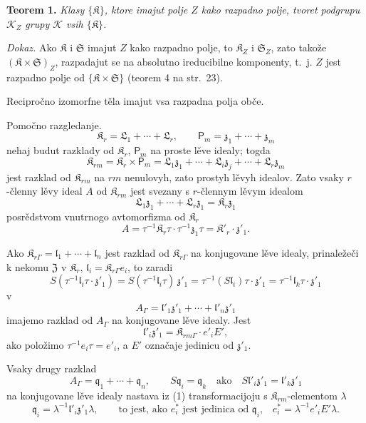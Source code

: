 \documentclass[11pt]{article}
\begin{document}
\textbf{Teorem 1.} \emph{Klasy \(\{\mathfrak K\}\), ktore imajut polje \(Z\) kako razpadno polje, tvoret podgrupu \(\mathscr K_Z\) grupy \(\mathscr K\) vsih \(\{\mathfrak K\}\).}

\emph{Dokaz.} Ako \(\mathfrak K\) i \(\mathfrak S\) imajut \(Z\) kako razpadno polje, to \(\mathfrak K_Z\) i \(\mathfrak S_Z\), zato takože \((\mathfrak K\times\mathfrak S)_Z\), razpadajut se na absolutno ireducibilne komponenty, t.~j. \(Z\) jest razpadno polje od \(\{\mathfrak K\times\mathfrak S\}\) (teorem 4 na str.~23).

Recipročno izomorfne těla imajut vsa razpadna polja obče.

Pomočno razgledanje.
\[
\mathfrak K_r=\mathfrak L_1+\cdots+\mathfrak L_r,\qquad
\mathsf P_m=\mathfrak z_1+\cdots+\mathfrak z_m
\]
nehaj budut razklady od \(\mathfrak K_r\), \(\mathsf P_m\) na proste lěve idealy; togda
\[
\mathfrak K_{rm}=\mathfrak K_r\times\mathsf P_m
=\mathfrak L_1\mathfrak z_1+\cdots+\mathfrak L_i\mathfrak z_j+\cdots+\mathfrak L_r\mathfrak z_m
\]
jest razklad od \(\mathfrak K_{rm}\) na \(rm\) nenulovyh, zato prostyh lěvyh idealov. Zato vsaky \(r\)-členny lěvy ideal \(A\) od \(\mathfrak K_{rm}\) jest svezany s \(r\)-člennym lěvym idealom
\[
\mathfrak L_1\mathfrak z_1+\cdots+\mathfrak L_r\mathfrak z_1=\mathfrak K_r\mathfrak z_1
\]
posrědstvom vnutrnogo avtomorfizma od \(\mathfrak K_r\)
\[
A=\tau^{-1}\mathfrak K_r\tau\cdot\tau^{-1}\mathfrak z_1\tau
=\mathfrak K'_r\cdot\mathfrak z'_1.
\]

Ako \(\mathfrak K_{r\Gamma}=\mathfrak l_1+\cdots+\mathfrak l_n\) jest razklad od \(\mathfrak K_{r\Gamma}\) na konjugovane lěve idealy, prinaležeči k nekomu \(\mathfrak Z\) v \(\mathfrak K_r\), \(\mathfrak l_i=\mathfrak K_{r\Gamma}e_i\), to zaradi
\[
S(\tau^{-1}\mathfrak l_i\tau\cdot\mathfrak z'_1)
=S(\tau^{-1}\mathfrak l_i\tau)\,\mathfrak z'_1
=\tau^{-1}(S\mathfrak l_i)\tau\cdot\mathfrak z'_1
=\tau^{-1}\mathfrak l_k\tau\cdot\mathfrak z'_1
\]
v
\[
\tag{1}
A_\Gamma=\mathfrak l'_1\mathfrak z'_1+\cdots+\mathfrak l'_n\mathfrak z'_1
\]
imajemo razklad od \(A_\Gamma\) na konjugovane lěve idealy. Jest
\[
\mathfrak l'_i\mathfrak z'_1=\mathfrak K_{rm\Gamma}\cdot e'_iE',
\]
ako položimo \(\tau^{-1}e_i\tau=e'_i\), a \(E'\) označaje jedinicu od \(\mathfrak z'_1\).

Vsaky drugy razklad
\[
\tag{2}
A_\Gamma=\mathfrak q_1+\cdots+\mathfrak q_n,\qquad
S\mathfrak q_i=\mathfrak q_k\quad\text{ako}\quad
S\mathfrak l'_i\mathfrak z'_1=\mathfrak l'_k\mathfrak z'_1
\]
na konjugovane lěve idealy nastava iz (1) transformacijoju s \(\mathfrak K_{rm}\)-elementom \(\lambda\)
\[
\mathfrak q_i=\lambda^{-1}\mathfrak l'_i\mathfrak z'_1\lambda,
\qquad
\text{to jest, ako \(e_i^*\) jest jedinica od \(\mathfrak q_i\),}\quad
e_i^*=\lambda^{-1}e'_iE'\lambda.
\]
\end{document}
